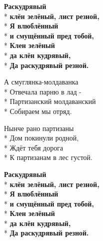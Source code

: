 \begin{minipage}{\linewidth}
\hspace*{1.5em}\textbf{Раскудрявый}\\*
\hspace*{1.5em}\textbf{клён зелёный, лист резной,}\\*
\hspace*{1.5em}\textbf{Я влюблённый}\\*
\hspace*{1.5em}\textbf{и смущённый пред тобой,}\\*
\hspace*{1.5em}\textbf{Клен зелёный}\\*
\hspace*{1.5em}\textbf{да клён кудрявый,}\\*
\hspace*{1.5em}\textbf{Да раскудрявый резной.}\\
\end{minipage}\par\medskip\nobreak

\medskip

\begin{minipage}{\linewidth}
А смуглянка-молдаванка\\*
Отвечала парню в лад -\\*
Партизанский молдаванский\\*
Собираем мы отряд.\\
\end{minipage}\par\medskip\nobreak

\medskip

\begin{minipage}{\linewidth}
Нынче рано партизаны\\*
Дом покинули родной,\\*
Ждёт тебя дорога\\*
К партизанам в лес густой.\\
\end{minipage}\par\medskip\nobreak

\medskip

\begin{minipage}{\linewidth}
\hspace*{1.5em}\textbf{Раскудрявый}\\*
\hspace*{1.5em}\textbf{клён зелёный, лист резной,}\\*
\hspace*{1.5em}\textbf{Я влюблённый}\\*
\hspace*{1.5em}\textbf{и смущённый пред тобой,}\\*
\hspace*{1.5em}\textbf{Клен зелёный}\\*
\hspace*{1.5em}\textbf{да клён кудрявый,}\\*
\hspace*{1.5em}\textbf{Да раскудрявый резной.}\\
\end{minipage}\par\medskip\nobreak

